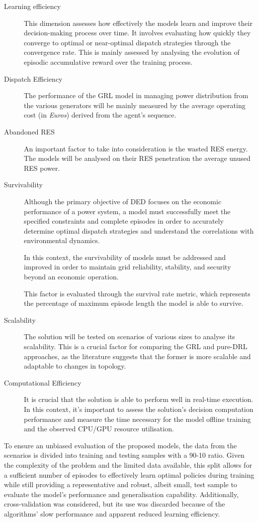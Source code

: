 \begin{description}
	\item[Learning efficiency] This dimension assesses how effectively the models learn and improve their decision-making process over time. It involves evaluating how quickly they converge to optimal or near-optimal dispatch strategies through the convergence rate. This is mainly assessed by analysing the evolution of episodic accumulative reward over the training process.
	
	\item[Dispatch Efficiency] The performance of the \ac{GRL} model in managing power distribution from the various generators will be mainly measured by the average operating cost (in \textit{Euros}) derived from the agent's sequence. 
	
	\item[Abandoned RES] An important factor to take into consideration is the wasted \ac{RES} energy. The models will be analysed on their \ac{RES} penetration the average unused \ac{RES} power.
	
	\item[Survivability] Although the primary objective of \ac{DED} focuses on the economic performance of a power system, a model must successfully meet the specified constraints and complete episodes in order to accurately determine optimal dispatch strategies and understand the correlations with environmental dynamics. \par
	In this context, the survivability of models must be addressed and improved in order to maintain grid reliability, stability, and security beyond an economic operation. \par
	This factor is evaluated through the survival rate metric, which represents the percentage of maximum episode length the model is able to survive.
	
	\item[Scalability]  The solution will be tested on scenarios of various sizes to analyse its scalability. This is a crucial factor for comparing the \ac{GRL} and pure-\ac{DRL} approaches, as the literature suggests that the former is more scalable and adaptable to changes in topology.
	
	\item[Computational Efficiency] It is crucial that the solution is able to perform well in real-time execution. In this context, it's important to assess the solution's decision computation performance and measure the time necessary for the model offline training and the observed CPU/GPU resource utilisation.
\end{description}
	
	To ensure an unbiased evaluation of the proposed models, the data from the scenarios is divided into training and testing samples with a 90-10 ratio. Given the complexity of the problem and the limited data available, this split allows for a sufficient number of episodes to effectively learn optimal policies during training while still providing a representative and robust, albeit small, test sample to evaluate the model's performance and generalisation capability. Additionally, cross-validation was considered, but its use was discarded because of the algorithms' slow performance and apparent reduced learning efficiency.

